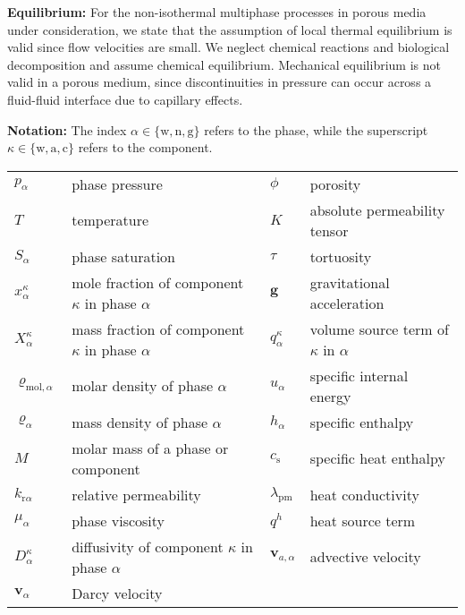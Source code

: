 \textbf{Equilibrium:}
For the non-isothermal multiphase processes in porous media under
consideration, we state that the assumption of local thermal
equilibrium is valid since flow velocities are small. We neglect
chemical reactions and biological decomposition and assume chemical
equilibrium.  Mechanical equilibrium is not valid in a porous medium, 
since discontinuities in pressure can occur across a fluid-fluid
interface due to capillary effects.

\textbf{Notation:} The index $\alpha \in \{\text{w}, \text{n}, \text{g}\}$ refers 
to the phase, while the superscript $\kappa \in \{\text{w}, \text{a}, \text{c}\}$ refers 
to the component. \\
\begin{tabular}{llll}
$p_\alpha$ & phase pressure & $\phi$ & porosity \\
$T$ & temperature & $K$ & absolute permeability tensor \\
$S_\alpha$ & phase saturation & $\tau$ & tortuosity \\
$x_\alpha^\kappa$ & mole fraction of component $\kappa$ in phase $\alpha$ & $\boldsymbol{g}$ & gravitational acceleration \\
$X_\alpha^\kappa$ & mass fraction of component $\kappa$ in phase $\alpha$ & $q^\kappa_\alpha$ & volume source term of $\kappa$ in $\alpha$ \\
$\varrho_{\text{mol},\alpha}$ & molar density of phase $\alpha$ & $u_\alpha$ & specific internal energy \\
$\varrho_{\alpha}$ & mass density of phase $\alpha$ & $h_\alpha$ & specific enthalpy \\
$M$ & molar mass of a phase or component & $c_\text{s}$ & specific heat enthalpy \\
$k_{\text{r}\alpha}$ & relative permeability & $\lambda_\text{pm}$ & heat conductivity \\
$\mu_\alpha$ & phase viscosity & $q^h$ & heat source term \\
$D_\alpha^\kappa$ & diffusivity of component $\kappa$ in phase $\alpha$ & $\boldsymbol{v}_{a,\alpha}$  & advective velocity \\
$\boldsymbol{v}_\alpha$ & Darcy velocity & & \\
\end{tabular}


